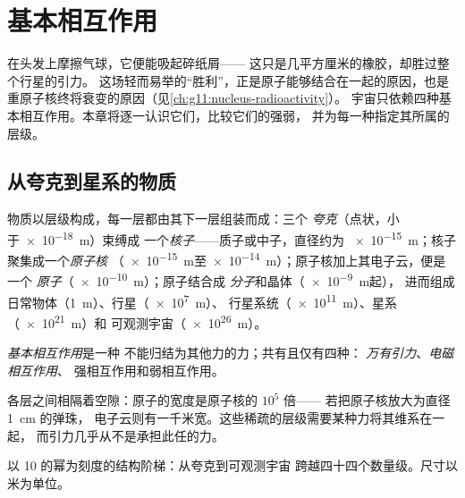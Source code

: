 \chapter{基本相互作用}\label{ch:g11:fundamental-interactions}

在头发上摩擦气球，它便能吸起碎纸屑——
这只是几平方厘米的橡胶，却胜过整个行星的引力。
这场轻而易举的“胜利”，正是原子能够结合在一起的原因，也是
重原子核终将衰变的原因（见\cref{ch:g11:nucleus-radioactivity}）。
宇宙只依赖四种基本相互作用。本章将逐一认识它们，比较它们的强弱，
并为每一种指定其所属的层级。

\section{从夸克到星系的物质}

\begin{definition}[结构阶梯]\label{def:g11:fundamental-interactions:ladder}
物质以层级构成，每一层都由其下一层组装而成：三个
\emph{夸克}（点状，小于\qty{e-18}{m}）束缚成
一个\emph{核子}——质子或中子，直径约为
\qty{e-15}{m}；核子聚集成一个\emph{原子核}
（\qty{e-15}{m}至\qty{e-14}{m}）；原子核加上其电子云，便是一个
\emph{原子}（\qty{e-10}{m}）；原子结合成
\emph{分子}和晶体（\qty{e-9}{m}起），
进而组成日常物体（\qty{1}{m}）、行星（\qty{e7}{m}）、
行星系统（\qty{e11}{m}）、星系（\qty{e21}{m}）和
可观测宇宙（\qty{e26}{m}）。
\end{definition}

\begin{definition}[四种基本相互作用]\label{def:g11:fundamental-interactions:four}
\emph{基本相互作用}是一种
不能归结为其他力的力；共有且仅有四种：
\emph{万有引力}、\emph{电磁相互作用}、
强相互作用和弱相互作用。
\end{definition}

\begin{remark}\label{rem:g11:fundamental-interactions:empty}
各层之间相隔着空隙：原子的宽度是原子核的 $10^{5}$ 倍——
若把原子核放大为直径 \qty{1}{cm} 的弹珠，
电子云则有一千米宽。这些稀疏的层级需要某种力将其维系在一起，
而引力几乎从不是承担此任的力。
\end{remark}

\begin{omfigure}

{\small 以 10 的幂为刻度的结构阶梯：从夸克到可观测宇宙
跨越四十四个数量级。尺寸以
米为单位。}
\end{omfigure}

